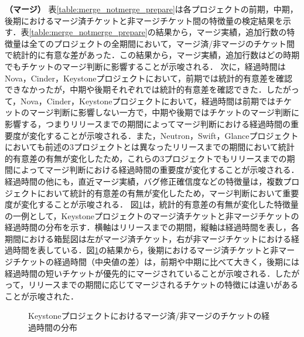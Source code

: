 \documentclass[submit]{ipsj}
\begin{document}
\textbf{（マージ）} 表\ref{table:merge_notmerge_prepare}は各プロジェクトの前期，中期，後期におけるマージ済チケットと非マージチケット間の特徴量の検定結果を示す．表\ref{table:merge_notmerge_prepare}の結果から，マージ実績，追加行数の特徴量は全てのプロジェクトの全期間において，マージ済/非マージのチケット間で統計的に有意な差があった．この結果から，マージ実績，追加行数はどの時期でもチケットのマージ判断に影響することが示唆される．
次に，経過時間はNova，Cinder，Keystoneプロジェクトにおいて，前期では統計的有意差を確認できなかったが，中期や後期それぞれでは統計的有意差を確認できた．したがって，Nova，Cinder，Keystoneプロジェクトにおいて，経過時間は前期ではチケットのマージ判断に影響しない一方で，中期や後期ではチケットのマージ判断に影響する，つまりリリースまでの期間によってマージ判断における経過時間の重要度が変化することが示唆される．また，Neutron，Swift，Glanceプロジェクトにおいても前述の3プロジェクトとは異なったリリースまでの期間において統計的有意差の有無が変化したため，これらの3プロジェクトでもリリースまでの期間によってマージ判断における経過時間の重要度が変化することが示唆される．経過時間の他にも，直近マージ実績，バグ修正確信度などの特徴量は，複数プロジェクトにおいて統計的有意差の有無が変化したため，マージ判断において重要度が変化することが示唆される．
図\ref{fig:merge_age}は，統計的有意差の有無が変化した特徴量の一例として，Keystoneプロジェクトのマージ済チケットと非マージチケットの経過時間の分布を示す．横軸はリリースまでの期間，縦軸は経過時間を表し，各期間における箱髭図は左がマージ済チケット，右が非マージチケットにおける経過時間を表している．図\ref{fig:merge_age}の結果から，後期におけるマージ済チケットと非マージチケットの経過時間（中央値の差）は，前期や中期に比べて大きく，後期には経過時間の短いチケットが優先的にマージされていることが示唆される．したがって，リリースまでの期間に応じてマージされるチケットの特徴には違いがあることが示唆された．

\begin{figure}[h]
\begin{center}
\caption{Keystoneプロジェクトにおけるマージ済/非マージのチケットの経過時間の分布}
\label{fig:merge_age}
\end{center}
\end{figure}
\end{document}
